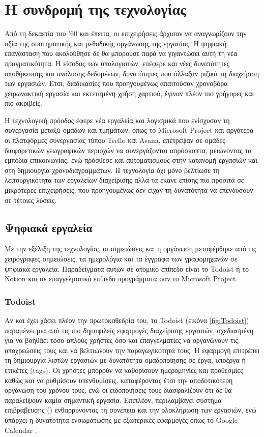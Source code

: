     \section{Η συνδρομή της τεχνολογίας}
        Από τη δεκαετία του '60 και έπειτα, οι επιχειρήσεις άρχισαν να αναγνωρίζουν την αξία της συστηματικής και μεθοδικής οργάνωσης της εργασίας. Η ψηφιακή επανάσταση που ακολούθησε δε θα μπορούσε παρά να γιγαντώσει αυτή τη νέα πραγματικότητα. Η είσοδος των υπολογιστών, επέφερε και νέες δυνατότητες αποθήκευσης και ανάλυσης δεδομένων, δυνατότητες που άλλαξαν ριζικά τη διαχείριση των εργασιών. Έτσι, διαδικασίες που προηγουμένως απαιτούσαν χρονοβόρα χειρωνακτική εργασία και εκτεταμένη χρήση χαρτιού, έγιναν πλέον πιο γρήγορες και πιο ακριβείς.

        Η τεχνολογική πρόοδος έφερε νέα εργαλεία και λογισμικά που ενίσχυσαν τη συνεργασία μεταξύ ομάδων και τμημάτων, όπως το Microsoft Project και αργότερα οι πλατφόρμες συνεργασίας τύπου Trello και Asana, επέτρεψαν σε ομάδες διαφορετικών γεωγραφικών περιοχών να συνεργάζονται απρόσκοπτα, μειώνοντας τα εμπόδια επικοινωνίας, ενώ πρόσθεσε και αυτοματισμούς στην κατανομή εργασιών και στη δημιουργία χρονοδιαγραμμάτων. Η τεχνολογία όχι μόνο βελτίωσε τη λειτουργικότητα των εργαλείων διαχείρισης αλλά τα έκανε επίσης πιο προσιτά σε μικρότερες επιχειρήσεις, που προηγουμένως δεν είχαν τη δυνατότητα να επενδύσουν σε τέτοιες λύσεις.

        \subsection{Ψηφιακά εργαλεία} \label{sec:digitaltools}
            Με την εξέλιξη της τεχνολογίας, οι σημειώσεις και η οργάνωση μεταφέρθηκε από τις χειρόγραφες σημειώσεις, τα ημερολόγια και τα έγγραφα των γραφομηχανών σε ψηφιακά εργαλεία. Παραδείγματα αυτών σε ατομικό επίπεδο είναι το Todoist ή το Notion και σε επαγγελματικό επίπεδο προγράμματα σαν το Microsoft Project.

            \subsubsection{Todoist}
                Αν και έχει χάσει πλέον την πρωτοκαθεδρία του, το Todoist (εικόνα \ref{fig:Todoist}) παραμένει μια από τις πιο δημοφιλείς εφαρμογές διαχείρισης εργασιών, σχεδιασμένη για να βοηθάει τόσο απλούς χρήστες όσο και επαγγελματίες να οργανώνουν τις υποχρεώσεις τους και να βελτιώνουν την παραγωγικότητά τους. Η εφαρμογή επιτρέπει τη δημιουργία λιστών εργασιών με δυνατότητα ομαδοποίησης σε έργα, υποέργα ή ετικέτες (tags). Οι χρήστες μπορούν να καθορίσουν ημερομηνίες και προθεσμίες καθώς και να ρυθμίσουν υπενθυμίσεις, καταφέροντας έτσι την αποδοτικότερη οργάνωση του χρόνου τους, ενώ οι ειδοποιήσεις τους διασφαλίζουν ότι δε θα παραλείψουν καμία σημαντική εργασία. Επιπλέον, περιλαμβάνει σύστημα επιβράβευσης () ενθαρρύνοντας τη συνέπεια και την ολοκλήρωση των εργασιών, ενώ υπάρχει η δυνατότητα ενσωμάτωσης με εξωτερικές εφαρμογές όπως το Google Calendar \cite{Todoist}.

